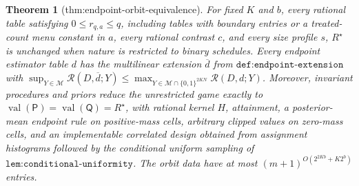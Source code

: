 \documentclass{article}
\newtheorem{theorem}{Theorem}
\begin{document}
\begin{theorem}[thm:endpoint-orbit-equivalence]\label{thm:endpoint-orbit-equivalence}
For fixed \(K\) and \(b\), every rational table satisfying \(0\le r_{q,a}\le q\), including tables with boundary entries or a treated-count menu constant in \(a\), every rational contrast \(c\), and every size profile \(s\), \(R^\star\) is unchanged when nature is restricted to binary schedules. Every endpoint estimator table \(d\) has the multilinear extension \(\overline d\) from \(\texttt{def:endpoint-extension}\) with \(\sup_{Y\in\mathcal M}\mathcal R(D,\overline d;Y)\le\max_{Y\in\mathcal M\cap\{0,1\}^{2KN}}\mathcal R(D,d;Y)\). Moreover, invariant procedures and priors reduce the unrestricted game exactly to \(\operatorname{val}(\mathsf P)=\operatorname{val}(\mathsf Q)=R^\star\), with rational kernel \(H\), attainment, a posterior-mean endpoint rule on positive-mass cells, arbitrary clipped values on zero-mass cells, and an implementable correlated design obtained from assignment histograms followed by the conditional uniform sampling of \(\texttt{lem:conditional-uniformity}\). The orbit data have at most \((m+1)^{O(2^{2Kb}+K2^b)}\) entries.
\end{theorem}
\end{document}
